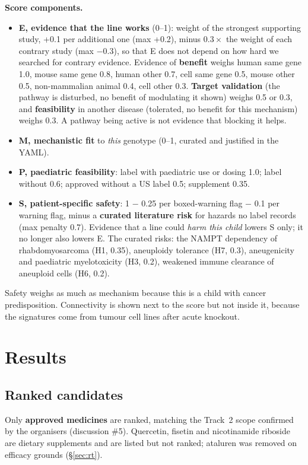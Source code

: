 \documentclass[10pt]{article}
\begin{document}
\textbf{Score components.}
\begin{itemize}
\item \textbf{E, evidence that the line works} (0–1): weight of the strongest supporting study, +0.1 per additional
  one (max +0.2), minus $0.3\times$ the weight of each contrary study (max $-0.3$), so that E does not depend on how
  hard we searched for contrary evidence. Evidence of \textbf{benefit} weighs human same gene 1.0, mouse same gene
  0.8, human other 0.7, cell same gene 0.5, mouse other 0.5, non-mammalian animal 0.4, cell other 0.3.
  \textbf{Target validation} (the pathway is disturbed, no benefit of modulating it shown) weighs 0.5 or 0.3, and
  \textbf{feasibility} in another disease (tolerated, no benefit for this mechanism) weighs 0.3. A pathway being
  active is not evidence that blocking it helps.
\item \textbf{M, mechanistic fit} to \textit{this} genotype (0–1, curated and justified in the YAML).
\item \textbf{P, paediatric feasibility}: label with paediatric use or dosing 1.0; label without 0.6; approved without a
  US label 0.5; supplement 0.35.
\item \textbf{S, patient-specific safety}: 1 $-$ 0.25 per boxed-warning flag $-$ 0.1 per warning flag, minus a
  \textbf{curated literature risk} for hazards no label records (max penalty 0.7). Evidence that a line could
  \emph{harm this child} lowers S only; it no longer also lowers E. The curated risks: the NAMPT dependency of
  rhabdomyosarcoma (H1, 0.35), aneuploidy tolerance (H7, 0.3), aneugenicity and paediatric myelotoxicity (H3, 0.2),
  weakened immune clearance of aneuploid cells (H6, 0.2).
\end{itemize}
Safety weighs as much as mechanism because this is a child with cancer predisposition. Connectivity is shown next to
the score but not inside it, because the signatures come from tumour cell lines after acute knockout.

\section{Results}

\subsection{Ranked candidates}
Only \textbf{approved medicines} are ranked, matching the Track~2 scope confirmed by the organisers (discussion \#5).
Quercetin, fisetin and nicotinamide riboside are dietary supplements and are listed but not ranked; ataluren was
removed on efficacy grounds (§\ref{sec:rt}).
\end{document}
